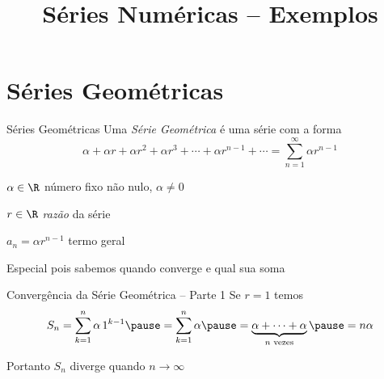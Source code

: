 
\usepackage{integracao_e_series}
\usepackage{cancel}

\title{Séries Numéricas -- Exemplos}



\addtitle

\section{Séries Geométricas}

\begin{frame}{Séries Geométricas}
	Uma \emph{Série Geométrica} é uma série com a forma
	\[
    \alpha + \alpha r + \alpha r^2 + \alpha r^3 + \cdots + \alpha r^{n-1} + \cdots
    = \sum_{n=1}^\infty \alpha r^{n-1}
  \]

  \pause\qquad\(\alpha\in\R\)          \tabto{33mm} número fixo não nulo, $\alpha\neq 0$

	\vspace{0.5\baselineskip}
  \pause\qquad\(r\in\R\)               \tabto{33mm} \emph{razão} da série

  \vspace{0.5\baselineskip}
  \pause\qquad\(a_n = \alpha r^{n-1}\) \tabto{33mm} termo geral

	\pause\vspace{\baselineskip}
	Especial pois sabemos quando converge e qual sua soma
\end{frame}

\begin{frame}{Convergência da Série Geométrica -- Parte 1}
	Se $r=1$
  \pause
  temos
	\[
    S_n
    = \sum_{k=1}^{n} \alpha \,1^{k-1}
    \pause
    = \sum_{k=1}^{n} \alpha
    \pause
    = \underbrace{\alpha + \cdots + \alpha}_{n \text{ vezes}}
    \pause
    = n\alpha
  \]

	\pause
	\vspace{\baselineskip}
	Portanto $S_n$ diverge quando $n\to\infty$
\end{frame}

